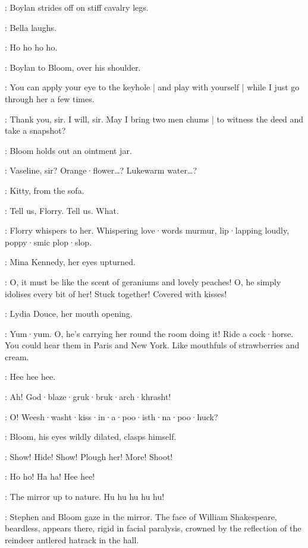 :
Boylan strides off on stiff cavalry legs.

:
Bella laughs.

\Bella:
Ho ho ho ho.

:
Boylan to Bloom,
over his shoulder.

\Boylan:
You can apply your eye to the keyhole |
and play with yourself |
while I just go through her a few times.

\Bloom:
Thank you,
sir.
I will,
sir.
May I bring two men chums |
to witness the deed and take a snapshot?

:
Bloom holds out an ointment jar.

\Bloom:
Vaseline,
sir?
Orange·flower…?
Lukewarm water…?

:
Kitty,
from the sofa.

\Kitty:
Tell us,
Florry.
Tell us.
What.

:
Florry whispers to her.
Whispering love·words murmur,
lip·lapping loudly,
poppy·smic plop·slop.

:
Mina Kennedy,
her eyes upturned.

\MinaKennedy:
O,
it must be like the scent of geraniums and lovely peaches!
%
O,
he simply idolises every bit of her!
Stuck together!
Covered with kisses!

:
Lydia Douce,
her mouth opening.

\LydiaDouce:
Yum·yum.
O,
he's carrying her round the room doing it!
Ride a cock·horse.
You could hear them in Paris and New York.
Like mouthfuls of strawberries and cream.

\Kitty:
Hee hee hee.

\BoylansVoice:
Ah!
God·blaze·gruk·bruk·arch·khrasht!%

\MarionsVoice:
O!
Weesh·washt·kiss·in·a·poo·isth·na·poo·huck?

:
Bloom,
his eyes wildly dilated,
clasps himself.

\Bloom:
Show! Hide! Show!
Plough her!
More!
Shoot!

\BellaZoeFlorryKitty:
Ho ho!
Ha ha!
Hee hee!

\Lynch:
The mirror up to nature.
%
Hu hu hu hu hu!

:
Stephen and Bloom gaze in the mirror.
The face of William Shakespeare,
beardless,
appears there,
rigid in facial paralysis,
crowned by the reflection of the reindeer antlered hatrack in the hall.


